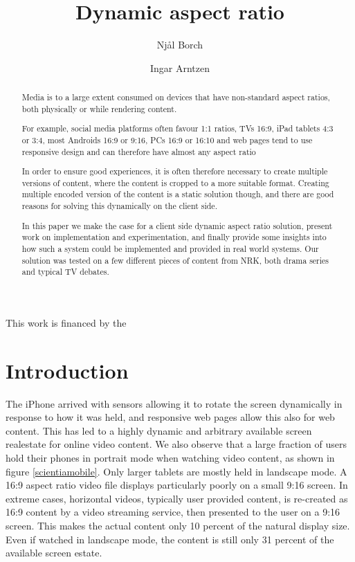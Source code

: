 \documentclass[sigconf, review=false]{acmart}
\title{Dynamic aspect ratio}
\author{Njål Borch}
\affiliation{NORCE}
\author{Ingar Arntzen}
\affiliation{NORCE}
\begin{document}
\begin{acks}
This work is financed by the

\end{acks}

 
\begin{abstract}


Media is to a large extent consumed on devices that have non-standard aspect
ratios, both physically or while rendering content. 

For example, social media platforms often favour 1:1 ratios, TVs 16:9, iPad
tablets 4:3 or 3:4, most Androids 16:9 or 9:16, PCs 16:9 or 16:10 and web
pages tend to use responsive design and can therefore have almost any aspect
ratio

In order to ensure good experiences, it is often therefore necessary to create
multiple versions of content, where the content is cropped to a more suitable
format. Creating multiple encoded version of the content is a static solution
though, and there are good reasons for solving this dynamically on the client
side. 

In this paper we make the case for a client side dynamic aspect ratio
solution, present work on implementation and experimentation, and finally
provide some insights into how such a system could be implemented and
provided in real world systems. Our solution was tested on a few different
pieces of content from NRK, both drama series and typical TV debates.
\end{abstract}

\maketitle
\shortauthors

\section{Introduction}\label{introduction}

The iPhone arrived with sensors allowing it to rotate the screen dynamically
in response to how it was held, and responsive web pages allow this also for
web content. This has led to a highly dynamic and arbitrary available screen
realestate for online video content. We also observe that a large fraction of
users hold their phones in portrait mode when watching video content, as
shown in figure \ref{scientiamobile}. Only larger tablets are mostly held in
landscape mode. A 16:9 aspect ratio video file displays particularly poorly
on a small 9:16 screen. In extreme cases, horizontal videos, typically user
provided content, is re-created as 16:9 content by a video streaming service,
then presented to the user on a 9:16 screen. This makes the actual content
only 10 percent of the natural display size. Even if watched in landscape
mode, the content is still only 31 percent of the available screen estate. 
\end{document}
